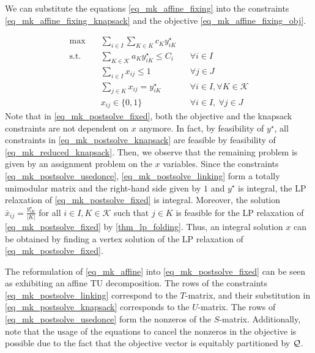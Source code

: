 \documentclass[pdflatex,sn-mathphys-num]{sn-jnl}%
\theoremstyle{thmstyleone}%
\theoremstyle{thmstylethree}%
\theoremstyle{thmstyletwo}%
\begin{document}
We can substitute the equations \eqref{eq_mk_affine_fixing} into the constraints \eqref{eq_mk_affine_fixing_knapsack} and the objective \eqref{eq_mk_affine_fixing_obj}.

\begin{subequations}
\label{eq_mk_postsolve_fixed}
\begin{align}
\max\quad & \sum_{i\in I}\sum_{K\in K} c_K y^\star_{iK} \\
\text{s.t.}\quad 
& \sum_{K\in \mathcal{K}} a_K y^\star_{iK} \leq C_i 
&& \forall i\in I \label{eq_mk_postsolve_knapsack}\\
& \sum_{i\in I} x_{ij} \leq 1 
&& \forall j\in J \label{eq_mk_postsolve_usedonce}\\
& \sum_{j\in K} x_{ij} = y^{\star}_{iK} &&\forall i \in I, \forall K\in \mathcal{K} \label{eq_mk_postsolve_linking}\\
& x_{ij} \in \{0,1\} 
&& \forall i\in I,\ \forall j\in J
\end{align}
\end{subequations}
Note that in \eqref{eq_mk_postsolve_fixed}, both the objective and the knapsack constraints are not dependent on $x$ anymore. In fact, by feasibility of $y^\star$, all constraints in \eqref{eq_mk_postsolve_knapsack} are feasible by feasibility of \eqref{eq_mk_reduced_knapsack}.
Then, we observe that the remaining problem is given by an assignment problem on the $x$ variables. Since the constraints \eqref{eq_mk_postsolve_usedonce}, \eqref{eq_mk_postsolve_linking} form a totally unimodular matrix and the right-hand side given by $1$ and $y^\star$ is integral, the LP relaxation of \eqref{eq_mk_postsolve_fixed} is integral. Moreover, the solution $\bar{x}_{ij} = \frac{y^\star_{iK}}{|K|}$ for all $i\in I, K\in\mathcal{K}$ such that $j\in K$ is feasible for the LP relaxation of \eqref{eq_mk_postsolve_fixed} by \cref{thm_lp_folding}. Thus, an integral solution $x$ can be obtained by finding a vertex solution of the LP relaxation of \eqref{eq_mk_postsolve_fixed}.

The reformulation of \eqref{eq_mk_affine} into \eqref{eq_mk_postsolve_fixed} can be seen as exhibiting an affine TU decomposition. The rows of the constraints \eqref{eq_mk_postsolve_linking} correspond to the $T$-matrix, and their substitution in \eqref{eq_mk_postsolve_knapsack} corresponds to the $U$-matrix. The rows of \eqref{eq_mk_postsolve_usedonce} form the nonzeros of the $S$-matrix.
Additionally, note that the usage of the equations to cancel the nonzeros in the objective is possible due to the fact that the objective vector is equitably partitioned by $\mathcal{Q}$.\\
\end{document}
